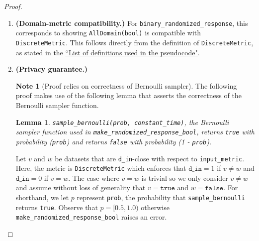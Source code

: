 \documentclass[11pt,a4paper]{article}
\newtheorem{lemma}[theorem]{Lemma}
\newcommand{\vicki}[1]{{ {\color{blue}{(vicki)~#1}}}}
\newcommand{\din}{\texttt{d\_in}}
\theoremstyle{definition}
\newtheorem{note}{Note}
\begin{document}
\begin{proof}
\begin{enumerate}
    
    

    \item \textbf{(Domain-metric compatibility.)} For \texttt{binary\_randomized\_response}, this corresponds to showing \texttt{AllDomain(bool)} is compatible with \texttt{DiscreteMetric}. This follows directly from the definition of \texttt{DiscreteMetric}, as stated in the \href{https://github.com/opendp/whitepapers/blob/pseudocode-defns/pseudocode-defns/pseudocode_defns.pdf}{``List of definitions used in the pseudocode"}.
    
    \item \textbf{(Privacy guarantee.)} 
    
    \begin{tcolorbox}
\begin{note}[Proof relies on correctness of Bernoulli sampler]
The following proof makes use of the following lemma that asserts the correctness of the Bernoulli sampler function.
    \begin{lemma}
    \texttt{sample\_bernoulli(prob, constant\_time)}, the Bernoulli sampler function used in \texttt{make\_randomized\_response\_bool}, returns \texttt{true} with probability (\texttt{prob}) and returns  \texttt{false} with probability (1 - \texttt{prob}).
    \end{lemma}
\end{note}
\end{tcolorbox}
    \vicki{to do: need to relax the epsilon-delta defns.} 
    
    Let $v$ and $w$ be datasets that are \texttt{d\_in}-close with respect to \texttt{input\_metric}. Here, the metric is \texttt{DiscreteMetric} which enforces that $\din = 1$ if $v \ne w$ and $\din = 0$ if $v = w$. The case where $v = w$ is trivial so we only consider $v \ne w$ and assume without loss of generality that $v = \texttt{true}$ and $w = \texttt{false}$. For shorthand, we let $p$ represent \texttt{prob}, the probability that \texttt{sample\_bernoulli} returns \texttt{true}. Observe that $p = [0.5, 1.0)$ otherwise \texttt{make\_randomized\_response\_bool} raises an error. 
    

\end{enumerate}
\end{proof}
\end{document}
